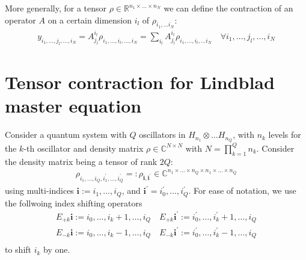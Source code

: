 \documentclass[letterpaper]{article}
\newcommand{\R}{\mathds{R}}
\newcommand{\C}{\mathds{C}}
\newcommand{\bfi}{\boldsymbol{i}}
\begin{document}
More generally, for a tensor $\rho \in \R^{n_1\times \dots \times n_N}$ we can define the contraction of an operator $A$ on a certain dimension $i_l$ of $\rho_{i_1,\dots i_N}$:
\begin{align}
    y_{i_1,\dots,j_l,\dots,i_N} = A_{j_l}^{i_l} \rho_{i_1,\dots,i_l,\dots,i_N} = \sum_{i_l} A_{j_l}^{i_l} \rho_{i_1,\dots,i_l,\dots i_N} \quad \forall i_1,\dots, j_l,\dots,i_N
\end{align}



\section{Tensor contraction for Lindblad master equation}
Consider a quantum system with $Q$ oscillators in $H_{n_1} \otimes \dots H_{n_Q}$, with $n_k$ levels for the $k$-th oscillator and density matrix $\rho \in \C^{N\times N}$ with $N=\prod_{k=1}^{Q} n_k$. Consider the density matrix being a tensor of rank $2Q$: 
\begin{align}
    \rho_{i_1,\dots, i_Q, i_1^{\prime}, \dots, i_Q^{\prime}} =: \rho_{\bfi, \bfi^\prime}\in\C^{n_1\times \dots \times n_Q \times n_1 \times \dots \times n_Q}
\end{align}
using multi-indices $\bfi := i_{1},\dots,i_{Q}$, and $\bfi^\prime = i_0^\prime, \dots, i_Q^\prime$. For ease of notation, we use the follwoing index shifting operators 
\begin{align}
  E_{+k} \bfi := i_0,\dots, i_{k}+1, \dots, i_Q \quad E_{+k} \bfi^\prime := i_0^\prime, \dots, i_k^\prime + 1, \dots, i_Q\\
  E_{-k} \bfi := i_0,\dots, i_{k}-1, \dots, i_Q \quad E_{-k} \bfi^\prime := i_0^\prime, \dots, i_k^\prime - 1, \dots, i_Q\\
\end{align}
to shift $i_k$ by one. 
\end{document}
